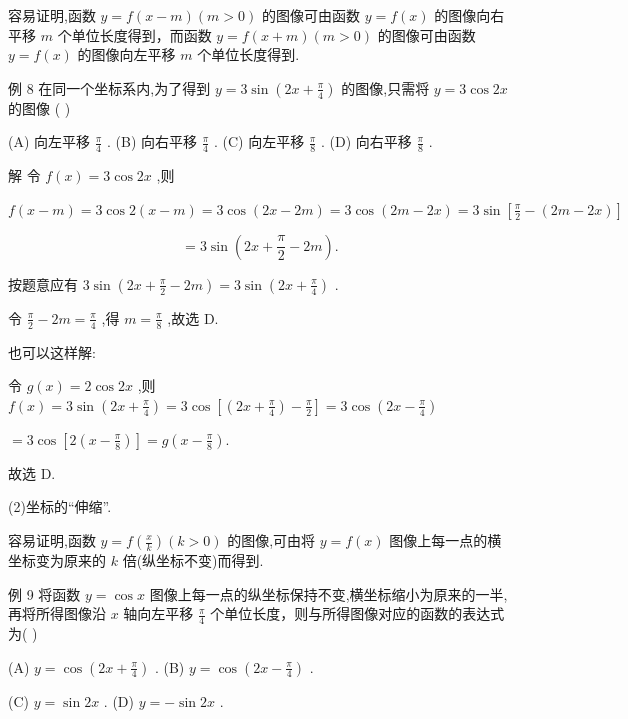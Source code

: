\documentclass[10pt]{article}
\begin{document}
容易证明,函数 \(y = f\left( {x - m}\right) \left( {m > 0}\right)\) 的图像可由函数 \(y = f\left( x\right)\) 的图像向右平移 \(m\) 个单位长度得到，而函数 \(y = f\left( {x + m}\right) \left( {m > 0}\right)\) 的图像可由函数 \(y = f\left( x\right)\) 的图像向左平移 \(m\) 个单位长度得到.

例 8 在同一个坐标系内,为了得到 \(y = 3\sin \left( {{2x} + \frac{\pi }{4}}\right)\) 的图像,只需将 \(y = 3\cos {2x}\) 的图像 ( )

(A) 向左平移 \(\frac{\pi }{4}\) . (B) 向右平移 \(\frac{\pi }{4}\) . (C) 向左平移 \(\frac{\pi }{8}\) . (D) 向右平移 \(\frac{\pi }{8}\) .

解 令 \(f\left( x\right)  = 3\cos {2x}\) ,则

\(f\left( {x - m}\right)  = 3\cos 2\left( {x - m}\right)  = 3\cos \left( {{2x} - {2m}}\right)  = 3\cos \left( {{2m} - {2x}}\right)  = 3\sin \left\lbrack  {\frac{\pi }{2} - \left( {{2m} - {2x}}\right) }\right\rbrack\)

\[
= 3\sin \left( {{2x} + \frac{\pi }{2} - {2m}}\right) .
\]

按题意应有 \(3\sin \left( {{2x} + \frac{\pi }{2} - {2m}}\right)  = 3\sin \left( {{2x} + \frac{\pi }{4}}\right)\) .

令 \(\frac{\pi }{2} - {2m} = \frac{\pi }{4}\) ,得 \(m = \frac{\pi }{8}\) ,故选 D.

也可以这样解:

令 \(g\left( x\right)  = 2\cos {2x}\) ,则 \(f\left( x\right)  = 3\sin \left( {{2x} + \frac{\pi }{4}}\right)  = 3\cos \left\lbrack  {\left( {{2x} + \frac{\pi }{4}}\right)  - \frac{\pi }{2}}\right\rbrack   = 3\cos \left( {{2x} - \frac{\pi }{4}}\right)\)

\(= 3\cos \left\lbrack  {2\left( {x - \frac{\pi }{8}}\right) }\right\rbrack   = g\left( {x - \frac{\pi }{8}}\right) .\)

故选 D.

(2)坐标的“伸缩”.

容易证明,函数 \(y = f\left( \frac{x}{k}\right) \left( {k > 0}\right)\) 的图像,可由将 \(y = f\left( x\right)\) 图像上每一点的横坐标变为原来的 \(k\) 倍(纵坐标不变)而得到.

例 9 将函数 \(y = \cos x\) 图像上每一点的纵坐标保持不变,横坐标缩小为原来的一半,再将所得图像沿 \(x\) 轴向左平移 \(\frac{\pi }{4}\) 个单位长度，则与所得图像对应的函数的表达式为( )

(A) \(y = \cos \left( {{2x} + \frac{\pi }{4}}\right)\) . (B) \(y = \cos \left( {{2x} - \frac{\pi }{4}}\right)\) .

(C) \(y = \sin {2x}\) . (D) \(y =  - \sin {2x}\) .
\end{document}
